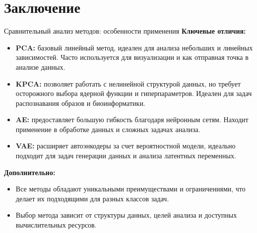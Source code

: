 \section{Заключение}

\begin{frame}[allowframebreaks]{Сравнительный анализ методов: особенности применения}
    \textbf{Ключевые отличия:}
    \begin{itemize}
        \item \textbf{PCA:} базовый линейный метод, идеален для анализа небольших и линейных зависимостей. Часто используется для визуализации и как отправная точка в анализе данных.
        \item \textbf{KPCA:} позволяет работать с нелинейной структурой данных, но требует осторожного выбора ядерной функции и гиперпараметров. Идеален для задач распознавания образов и биоинформатики.
        \item \textbf{AE:} предоставляет большую гибкость благодаря нейронным сетям. Находит применение в обработке данных и сложных задачах анализа.
        \item \textbf{VAE:} расширяет автоэнкодеры за счет вероятностной модели, идеально подходит для задач генерации данных и анализа латентных переменных.
    \end{itemize}
    \textbf{Дополнительно:}
    \begin{itemize}
        \item Все методы обладают уникальными преимуществами и ограничениями, что делает их подходящими для разных классов задач.
        \item Выбор метода зависит от структуры данных, целей анализа и доступных вычислительных ресурсов.
    \end{itemize}
\end{frame}

